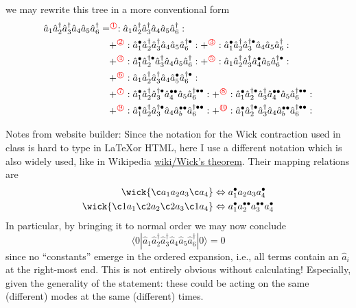 we may rewrite this tree in a more conventional form
\begin{align*}
    \hat{a}_1\hat{a}_{2}^{\dagger}\hat{a}_{3}^{\dagger}\hat{a}_4\hat{a}_5\hat{a}_{6}^{\dagger}&=^{{\color{red} \text{\textcircled{1}}}}:\hat{a}_1\hat{a}_{2}^{\dagger}\hat{a}_{3}^{\dagger}\hat{a}_4\hat{a}_5\hat{a}_{6}^{\dagger}:\\
    &\quad+^{{\color{red} \text{\textcircled{2}}}}:\hat{a}_{1}^{\bullet}\hat{a}_{2}^{\dagger}\hat{a}_{3}^{\dagger}\hat{a}_4\hat{a}_5\hat{a}_{6}^{\dagger \bullet}:+^{{\color{red} \text{\textcircled{3}}}}:\hat{a}_{1}^{\bullet}\hat{a}_{2}^{\dagger}\hat{a}_{3}^{\dagger \bullet}\hat{a}_4\hat{a}_5\hat{a}_{6}^{\dagger}:\\
    &\quad+^{{\color{red} \text{\textcircled{4}}}}:\hat{a}_{1}^{\bullet}\hat{a}_{2}^{\dagger \bullet}\hat{a}_{3}^{\dagger}\hat{a}_4\hat{a}_5\hat{a}_{6}^{\dagger}:+^{{\color{red} \text{\textcircled{5}}}}:\hat{a}_1\hat{a}_{2}^{\dagger}\hat{a}_{3}^{\dagger}\hat{a}_{4}^{\bullet}\hat{a}_5\hat{a}_{6}^{\dagger \bullet}:\\
    &\quad+^{{\color{red} \text{\textcircled{6}}}}:\hat{a}_1\hat{a}_{2}^{\dagger}\hat{a}_{3}^{\dagger}\hat{a}_4\hat{a}_{5}^{\bullet}\hat{a}_{6}^{\dagger \bullet}:\\
    &\quad+^{{\color{red} \text{\textcircled{7}}}}:\hat{a}_{1}^{\bullet}\hat{a}_{2}^{\dagger}\hat{a}_{3}^{\dagger \bullet}\hat{a}_{4}^{\bullet \bullet}\hat{a}_5\hat{a}_{6}^{\dagger \bullet \bullet}:+^{{\color{red} \text{\textcircled{8}}}}:\hat{a}_{1}^{\bullet}\hat{a}_{2}^{\dagger \bullet}\hat{a}_{3}^{\dagger}\hat{a}_{4}^{\bullet \bullet}\hat{a}_5\hat{a}_{6}^{\dagger \bullet \bullet}:\\
    &\quad+^{{\color{red} \text{\textcircled{9}}}}:\hat{a}_{1}^{\bullet}\hat{a}_{2}^{\dagger}\hat{a}_{3}^{\dagger \bullet}\hat{a}_4\hat{a}_{b}^{\bullet \bullet}\hat{a}_{6}^{\dagger \bullet \bullet}:+^{{\color{red} \text{\textcircled{10}}}}:\hat{a}_{1}^{\bullet}\hat{a}_{2}^{\dagger \bullet}\hat{a}_{3}^{\dagger}\hat{a}_4\hat{a}_{b}^{\bullet \bullet}\hat{a}_{6}^{\dagger \bullet \bullet}:
\end{align*}

Notes from website builder: Since the notation for the Wick contraction used in class is hard to type in \LaTeX or HTML, here I use a different notation which is also widely used, like in Wikipedia \href{https://en.wikipedia.org/wiki/Wick\%27s\_theorem}{wiki/Wick's theorem}. Their mapping relations are
\begin{align*}
    \wick{\c a_1 a_2 a_3 \c a_4} &\Leftrightarrow a_1^\bullet a_2a_3a_4^\bullet\\
    \wick{\c1 a_1 \c2 a_2 \c2 a_3 \c1 a_4} &\Leftrightarrow a_1^\bullet a_2^{\bullet\bullet}a_3^{\bullet\bullet}a_4^\bullet
\end{align*}
In particular, by bringing it to normal order we may now conclude
\[ \langle 0|\hat{a}_1\hat{a}_{2}^{\dagger}\hat{a}_{3}^{\dagger}\hat{a}_4\hat{a}_5\hat{a}_{6}^{\dagger}|0\rangle =0\]
since no ``constants'' emerge in the ordered expansion, i.e., all terms contain an $\hat{a}_i$ at the right-most end. This is not entirely obvious without calculating! Especially, given the generality of the statement: these could be acting on the same (different) modes at the same (different) times.

